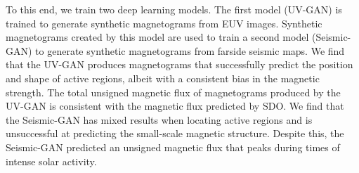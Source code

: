 \documentclass[11pt,a4paper,onecolumn]{report}
\begin{document}
To this end, we train two deep learning models. The first model (UV-GAN) is
trained to generate synthetic magnetograms from EUV images. Synthetic
magnetograms created by this model are used to train a second model
(Seismic-GAN) to generate synthetic magnetograms from farside seismic maps. We
find that the UV-GAN produces magnetograms that successfully predict the
position and shape of active regions, albeit with a consistent bias in the
magnetic strength. The total unsigned magnetic flux of magnetograms produced by
the UV-GAN is consistent with the magnetic flux predicted by SDO. We find that
the Seismic-GAN has mixed results when locating active regions and is
unsuccessful at predicting the small-scale magnetic structure. Despite this, the
Seismic-GAN predicted an unsigned magnetic flux that peaks during times of
intense solar activity.



\end{document}
